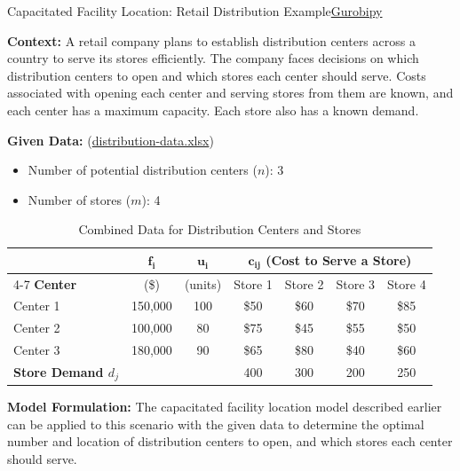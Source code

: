 \begin{examplewithcode}{Capacitated Facility Location: Retail Distribution Example}{\href{https://github.com/open-optimization/open-optimization-or-examples/blob/master/integer-programming/facility-location-capacitated.ipynb}{Gurobipy}}

\textbf{Context:} A retail company plans to establish distribution centers across a country to serve its stores efficiently. The company faces decisions on which distribution centers to open and which stores each center should serve. Costs associated with opening each center and serving stores from them are known, and each center has a maximum capacity. Each store also has a known demand.

\textbf{Given Data:} (\href{https://github.com/open-optimization/open-optimization-or-examples/blob/master/integer-programming/distribution-data.xlsx}{distribution-data.xlsx})

\begin{itemize}
    \item Number of potential distribution centers ($n$): 3
    \item Number of stores ($m$): 4
\end{itemize}


\begin{table}[ht]
\centering
\caption{Combined Data for Distribution Centers and Stores}
\begin{tabular}{lcc|cccc}
\toprule
 & \(\mathbf{f_i}\) & \(\mathbf{u_i}\) & \multicolumn{4}{c}{\(\mathbf{c_{ij}}\) (Cost to Serve a Store)} \\
\cmidrule(lr){4-7}
\textbf{Center} & (\$) & (units) & Store 1 & Store 2 & Store 3 & Store 4 \\
\midrule
Center 1 & 150,000 & 100 & \$50 & \$60 & \$70 & \$85 \\
Center 2 & 100,000 & 80  & \$75 & \$45 & \$55 & \$50 \\
Center 3 & 180,000 & 90  & \$65 & \$80 & \$40 & \$60 \\
\midrule
\textbf{Store Demand \(d_j\)} & & & 400 & 300 & 200 & 250 \\
\bottomrule
\end{tabular}
\end{table}

\textbf{Model Formulation:}
The capacitated facility location model described earlier can be applied to this scenario with the given data to determine the optimal number and location of distribution centers to open, and which stores each center should serve.
\begin{center}
\par{}\label{fig:facility-location}%

\end{center}
\end{examplewithcode}

